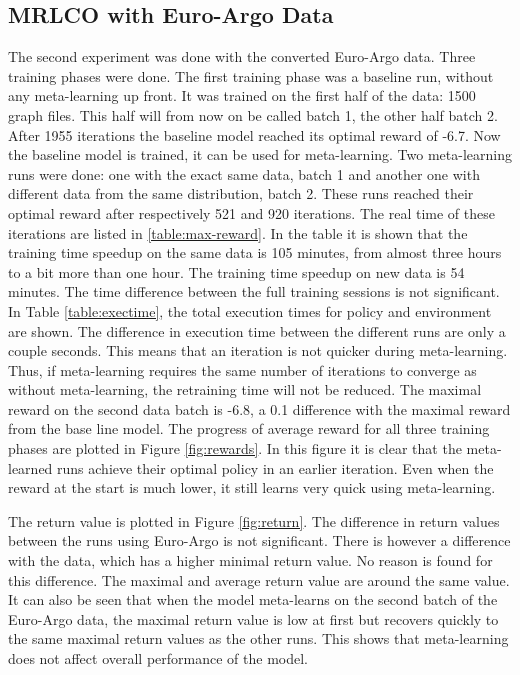



\subsection{MRLCO with Euro-Argo Data}

The second experiment was done with the converted Euro-Argo data. Three
training phases were done. The first training phase was a baseline run,
without any meta-learning up front. It was trained on the first half of the
data: 1500 graph files. This half will from now on be called batch 1, the
other half batch 2. After 1955 iterations the baseline model reached its
optimal reward of -6.7. Now the baseline model is trained, it can be used for
meta-learning. Two meta-learning runs were done: one with the exact same data,
batch 1 and another one with different data from the same distribution, batch
2. These runs reached their optimal reward after respectively 521 and 920
iterations. The real time of these iterations are listed in
\ref{table:max-reward}. In the table it is shown that the training time
speedup on the same data is 105 minutes, from almost three hours to a bit more
than one hour. The training time speedup on new data is 54 minutes. The time
difference between the full training sessions is not significant. In Table
\ref{table:exectime}, the total execution times for policy and environment are
shown. The difference in execution time between the different runs are only a
couple seconds. This means that an iteration is not quicker during
meta-learning. Thus, if meta-learning requires the same number of iterations
to converge as without meta-learning, the retraining time will not be reduced.
The maximal reward on the second data batch is -6.8, a 0.1 difference with the
maximal reward from the base line model. The progress of average reward for
all three training phases are plotted in Figure \ref{fig:rewards}. In this
figure it is clear that the meta-learned runs achieve their optimal policy in
an earlier iteration. Even when the reward at the start is much lower, it
still learns very quick using meta-learning.

The return value is plotted in Figure \ref{fig:return}. The difference in return
values between the runs using Euro-Argo is not significant. There is however a
difference with the \mrlco data, which has a higher minimal return value. No
reason is found for this difference. The maximal and average return value are
around the same value. It can also be seen that when the model meta-learns on
the second batch of the Euro-Argo data, the maximal return value is low at
first but recovers quickly to the same maximal return values as the other
runs. This shows that meta-learning does not affect overall performance of
the model.


